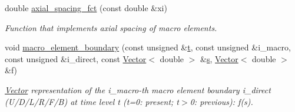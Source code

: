 \begin{DoxyCompactItemize}
double \hyperlink{classoomph_1_1QuarterPipeDomain_a035e27884c0fa1bc31d1d9bed28c37bd}{axial\+\_\+spacing\+\_\+fct} (const double \&xi)
\begin{DoxyCompactList}\small\item\em Function that implements axial spacing of macro elements. \end{DoxyCompactList}\item 
void \hyperlink{classoomph_1_1QuarterPipeDomain_ae8cc6433c58dcfb265335744ed8a330a}{macro\+\_\+element\+\_\+boundary} (const unsigned \&\hyperlink{cfortran_8h_af6f0bd3dc13317f895c91323c25c2b8f}{t}, const unsigned \&i\+\_\+macro, const unsigned \&i\+\_\+direct, const \hyperlink{classoomph_1_1Vector}{Vector}$<$ double $>$ \&\hyperlink{cfortran_8h_ab7123126e4885ef647dd9c6e3807a21c}{s}, \hyperlink{classoomph_1_1Vector}{Vector}$<$ double $>$ \&f)
\begin{DoxyCompactList}\small\item\em \hyperlink{classoomph_1_1Vector}{Vector} representation of the i\+\_\+macro-\/th macro element boundary i\+\_\+direct (U/\+D/\+L/\+R/\+F/B) at time level t (t=0\+: present; t$>$0\+: previous)\+: f(s). \end{DoxyCompactList}\end{DoxyCompactItemize}
